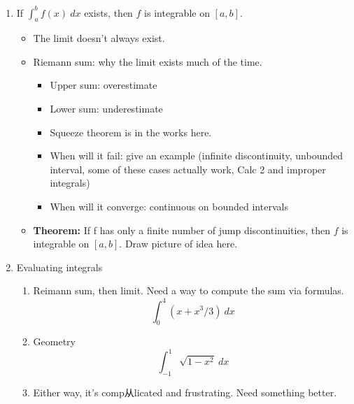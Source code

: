 \documentclass{article}
\newcommand{\ds}{\displaystyle}
\begin{document}
\begin{enumerate}
\item If $\ds\int_a^b f(x)~dx$ exists, then $f$ is integrable on $[a,b]$. 
\begin{itemize}
\item The limit doesn't always exist.
\item Riemann sum: why the limit exists much of the time.
\begin{itemize}
\item Upper sum: overestimate
\item Lower sum: underestimate
\item Squeeze theorem is in the works here.
\item When will it fail: give an example (infinite discontinuity, unbounded interval, some of these cases actually work, Calc 2 and improper integrals)
\item When will it converge: continuous on bounded intervals
\end{itemize}
\item {\bf Theorem:} If f has only a finite number of jump discontinuities, then $f$ is integrable on $[a,b]$. Draw picture of idea here.
\end{itemize}

\item Evaluating integrals
\begin{enumerate}
\item Reimann sum, then limit. Need a way to compute the sum via formulas.
$$
\int_0^4 (x+x^3/3)~dx
$$
\item Geometry
$$
\int_{-1}^1 \sqrt{1-x^2}~dx
$$
\item Either way, it's comp从licated and frustrating. Need something better.
\end{enumerate}
\end{enumerate}


\end{document}
